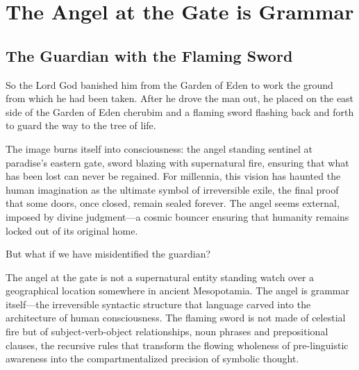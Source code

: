 \chapter{The Angel at the Gate is Grammar}

\section{The Guardian with the Flaming Sword}

So the Lord God banished him from the Garden of Eden to work the ground from which he had been taken. After he drove the man out, he placed on the east side of the Garden of Eden cherubim and a flaming sword flashing back and forth to guard the way to the tree of life.

The image burns itself into consciousness: the angel standing sentinel at paradise's eastern gate, sword blazing with supernatural fire, ensuring that what has been lost can never be regained. For millennia, this vision has haunted the human imagination as the ultimate symbol of irreversible exile, the final proof that some doors, once closed, remain sealed forever. The angel seems external, imposed by divine judgment—a cosmic bouncer ensuring that humanity remains locked out of its original home.

But what if we have misidentified the guardian?

The angel at the gate is not a supernatural entity standing watch over a geographical location somewhere in ancient Mesopotamia. The angel is grammar itself—the irreversible syntactic structure that language carved into the architecture of human consciousness. The flaming sword is not made of celestial fire but of subject-verb-object relationships, noun phrases and prepositional clauses, the recursive rules that transform the flowing wholeness of pre-linguistic awareness into the compartmentalized precision of symbolic thought.

\begin{center}
\end{center}

